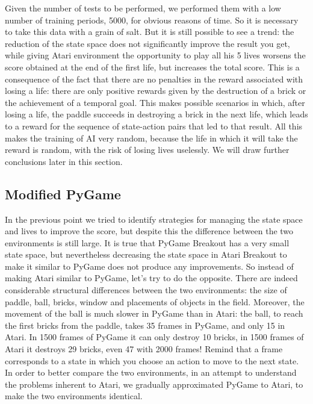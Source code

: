 Given the number of tests to be performed, we performed them with a low number of training periods, 5000, for obvious reasons of time. So it is necessary to take this data with a grain of salt. But it is still possible to see a trend: the reduction of the state space does not significantly improve the result you get, while giving Atari environment the opportunity to play all his 5 lives worsens the score obtained at the end of the first life, but increases the total score. This is a consequence of the fact that there are no penalties in the reward associated with losing a life: there are only positive rewards given by the destruction of a brick or the achievement of a temporal goal. This makes possible scenarios in which, after losing a life, the paddle succeeds in destroying a brick in the next life, which leads to a reward for the sequence of state-action pairs that led to that result. All this makes the training of AI very random, because the life in which it will take the reward is random, with the risk of losing lives uselessly. We will draw further conclusions later in this section.

\subsection{Modified PyGame}

In the previous point we tried to identify strategies for managing the state space and lives to improve the score, but despite this the difference between the two environments is still large. It is true that PyGame Breakout has a very small state space, but nevertheless decreasing the state space in Atari Breakout to make it similar to PyGame does not produce any improvements. So instead of making Atari similar to PyGame, let's try to do the opposite. There are indeed considerable structural differences between the two environments: the size of paddle, ball, bricks, window and placements of objects in the field. Moreover, the movement of the ball is much slower in PyGame than in Atari: the ball, to reach the first bricks from the paddle, takes 35 frames in PyGame, and only 15 in Atari. In 1500 frames of PyGame it can only destroy 10 bricks, in 1500 frames of Atari it destroys 29 bricks, even 47 with 2000 frames! Remind that a frame corresponds to a state in which you choose an action to move to the next state. In order to better compare the two environments, in an attempt to understand the problems inherent to Atari, we gradually approximated PyGame to Atari, to make the two environments identical.

